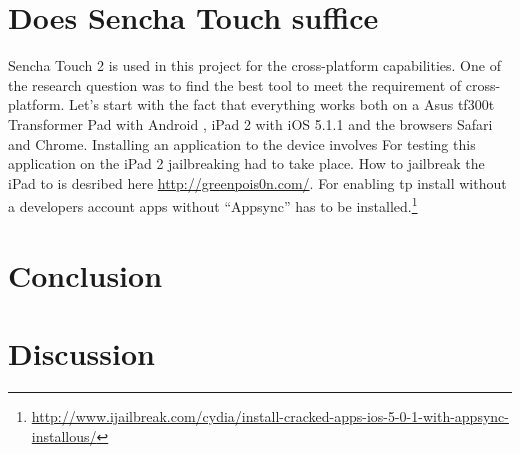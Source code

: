 \section{Does Sencha Touch suffice}
Sencha Touch 2 is used in this project for the cross-platform capabilities. One of the research question was to find the best tool to meet the requirement of cross-platform. Let's start with the fact that everything works both on a Asus tf300t Transformer Pad with Android , iPad 2 with iOS 5.1.1 and the browsers Safari and Chrome. Installing an application to the device involves For testing this application on the iPad 2 jailbreaking had to take place. How to jailbreak the iPad to is desribed here \url{http://greenpois0n.com/}. For enabling tp install without a developers account apps without ``Appsync'' has to be installed.\footnote{\url{http://www.ijailbreak.com/cydia/install-cracked-apps-ios-5-0-1-with-appsync-installous/}}


\section{Conclusion}

\section{Discussion}

